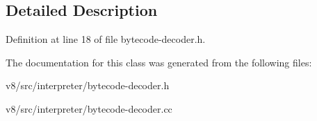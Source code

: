 \subsection{Detailed Description}


Definition at line 18 of file bytecode-\/decoder.\+h.



The documentation for this class was generated from the following files\+:\begin{DoxyCompactItemize}
\item 
v8/src/interpreter/bytecode-\/decoder.\+h\item 
v8/src/interpreter/bytecode-\/decoder.\+cc\end{DoxyCompactItemize}
